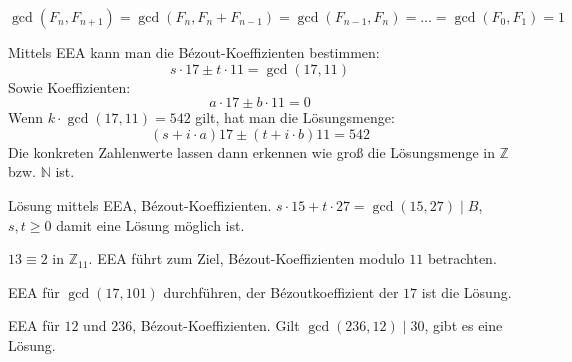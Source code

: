 \begin{flushenum}
\item $\gcd(F_n, F_{n+1}) = \gcd(F_n, F_n + F_{n-1}) = \gcd(F_{n-1}, F_n) = \ldots = \gcd(F_0, F_1) = 1$
\item Mittels EEA kann man die Bézout-Koeffizienten bestimmen:
\[ s \cdot 17 \pm t \cdot 11 = \gcd(17,11) \]
Sowie Koeffizienten:
\[ a \cdot 17 \pm b \cdot 11 = 0 \]
Wenn $k \cdot \gcd(17,11) = 542$ gilt, hat man die Lösungsmenge:
\[ (s + i\cdot a)17 \pm (t + i\cdot b)11 = 542 \]
Die konkreten Zahlenwerte lassen dann erkennen wie groß die Lösungsmenge in $\mathbb{Z}$ bzw. $\mathbb{N}$ ist.

\item Lösung mittels EEA, Bézout-Koeffizienten. $s \cdot 15 + t \cdot 27 = \gcd(15,27) \mid  B$, $s,t \geq 0$ damit eine Lösung möglich ist.

\item $13 \equiv 2$ in $\mathbb{Z}_{11}$. EEA führt zum Ziel, Bézout-Koeffizienten modulo $11$ betrachten.

\item EEA für $\gcd(17,101)$ durchführen, der Bézoutkoeffizient der $17$ ist die Lösung.

\item EEA für $12$ und $236$, Bézout-Koeffizienten. Gilt $\gcd(236,12) \mid 30$, gibt es eine Lösung.


\end{flushenum}
